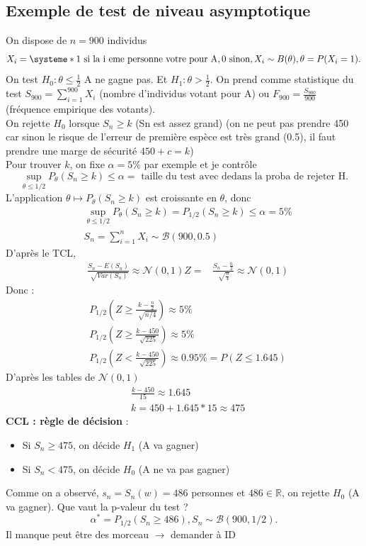 \documentclass{article}
\theoremstyle{plain}%
\theoremstyle{definition}
\theoremstyle{remark}
\begin{document}
\subsection{Exemple de test de niveau asymptotique}
On dispose de $ n=900 $ individus 
\[
    X_i = \systeme*{
        1 \text{ si la i eme personne votre pour A}, 
        0 \text{ sinon}
    }, X_i \sim B(\theta ), \theta = P(X_i=1)
.\]
On test $ H_0: \theta \leq \frac{1}{2} $ A ne gagne pas. Et $ H_1: \theta > \frac{1}{2} $. On prend comme statistique du test $ S_{900} = \sum_{i=1}^{900}X_i $ (nombre d'individus votant pour A) ou $ F_900 = \frac{S_{900}}{900} $ (fréquence empirique des votants). \\
On rejette $ H_0 $ lorsque $ S_n \geq k $ (Sn est assez grand) (on ne peut pas prendre 450 car sinon le risque de l'erreur de première espèce est très grand (0.5), il faut prendre une marge de sécurité $ 450 + c = k $)\\
Pour trouver $ k $, on fixe $ \alpha = 5\% $ par exemple et je contrôle 
\[
    \sup_{\theta \leq 1/2} P_\theta (S_n \geq k) \leq \alpha = \text{ taille du test avec dedans la proba de rejeter H}
.\]
L'application $ \theta \mapsto P_\theta (S_n \geq k) $ est croissante en $ \theta $, donc 
\begin{align*}
    &\sup_{\theta \leq 1/2} P_\theta (S_n \geq k) = P_{1/2}(S_n \geq k) \leq \alpha = 5\% \\
    &S_n = \sum_{i=1}^{n}X_i \sim \mathcal{B}(900,0.5) 
\end{align*}
D'après le TCL, \begin{align*}
    &\frac{S_n - E(S_n)}{\sqrt[]{Var(S_n)}} \approx \mathcal{N}(0,1)
    Z = & \frac{S_n - \frac{n}{2}}{\sqrt[]{\frac{n}{4}}} \approx \mathcal{N}(0,1)
\end{align*}
Donc : 
\begin{align*}
    & P_{1/2} (Z \geq \frac{k - \frac{n}{2}}{\sqrt[]{n/4}}) \approx 5\% \\
    & P_{1/2} (Z \geq \frac{k - 450}{\sqrt[]{225}}) \approx 5\% \\
    & P_{1/2} (Z < \frac{k - 450}{\sqrt[]{225}}) \approx 0.95\% = P(Z \leq 1.645)
\end{align*}
D'après les tables de $ \mathcal{N}(0,1) $
\begin{align*}
    & \frac{k-450}{15} \approx 1.645 \\
    & k=450+1.645*15 \approx 475
\end{align*}
\textbf{CCL : règle de décision} : 
\begin{itemize}
    \item Si $ S_n \geq 475 $, on décide $ H_1 $ (A va gagner) 
    \item Si $ S_n < 475 $, on décide $ H_0 $ (A ne va pas gagner) 
\end{itemize}
Comme on a observé, $ s_n=S_n(w) = 486 $ personnes et $ 486 \in 
\mathbb{R} $, on rejette $ H_0 $ (A va gagner). Que vaut la p-valeur du test ? 
\[
    \alpha ^* = P_{1/2} (S_n \geq 486), S_n \sim \mathcal{B}(900, 1/2)
.\]
Il manque peut être des morceau $\rightarrow$ demander à ID \\
\end{document}
